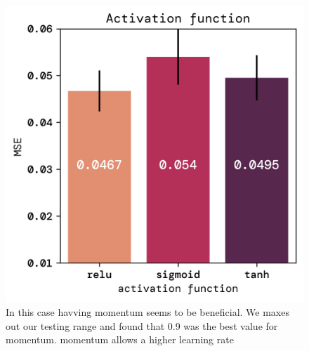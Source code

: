 \documentclass[twoside,11pt]{report}
\begin{document}
    \begin{figure}[!ht]
        \begin{minipage}[t]{0.5\textwidth - 1mm}
            \begin{center}
                \includegraphics[width=\textwidth]{../runsAndFigures/MSE_activs.png}
            \end{center}
            \caption{In this case havving momentum seems to be beneficial. We maxes out our testing range and found that 0.9 was the best value for momentum. momentum allows a higher learning rate}\label{fig:accuracy_optimizer}
        \end{minipage}
        \hspace{2mm}
        \begin{minipage}[t]{0.5\textwidth - 1mm}
            \begin{center}

\end{center}
\end{minipage}
\end{figure}
\end{document}
